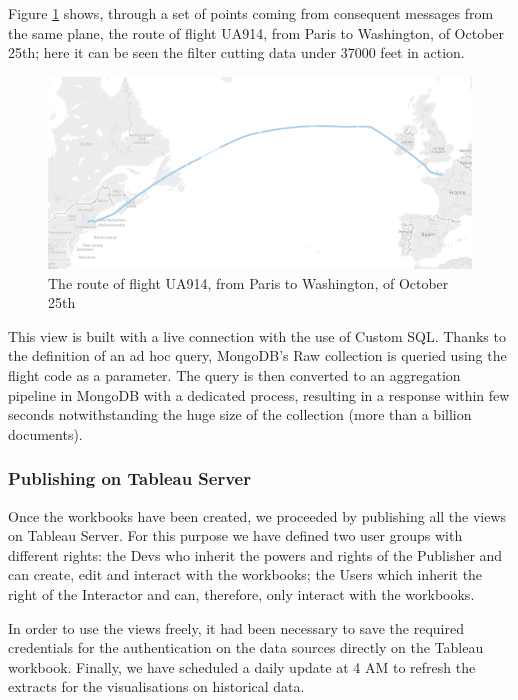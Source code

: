  Figure \ref{fig:RouteViz} shows, through a set of points coming from consequent messages from the same plane, the route of flight UA914, from Paris to Washington, of October 25th; here it can be seen the filter cutting data under 37000 feet in action.
\begin{figure}[h]
	\centering
	\includegraphics[width=0.9\linewidth]{Figures/RouteViz.png}
	\caption{The route of flight UA914, from Paris to Washington, of October 25th}
	\label{fig:RouteViz}
\end{figure}
This view is built with a live connection with the use of Custom SQL. Thanks to the definition of an ad hoc query, MongoDB's Raw collection is queried using the flight code as a parameter.
The query is then converted to an aggregation pipeline in MongoDB with a dedicated process, resulting in a response within few seconds notwithstanding the huge size of the collection (more than a billion documents).
\subsubsection{Publishing on Tableau Server}
Once the workbooks have been created, we proceeded by publishing all the views on Tableau Server. For this purpose we have defined two user groups with different rights: the Devs who inherit the powers and rights of the Publisher and can create, edit and interact with the workbooks; the Users which inherit the right of the Interactor and can, therefore, only interact with the workbooks.

In order to use the views freely, it had been necessary to save the required credentials for the authentication on the data sources directly on the Tableau workbook.
Finally, we have scheduled a daily update at 4 AM to refresh the extracts for the visualisations on historical data.